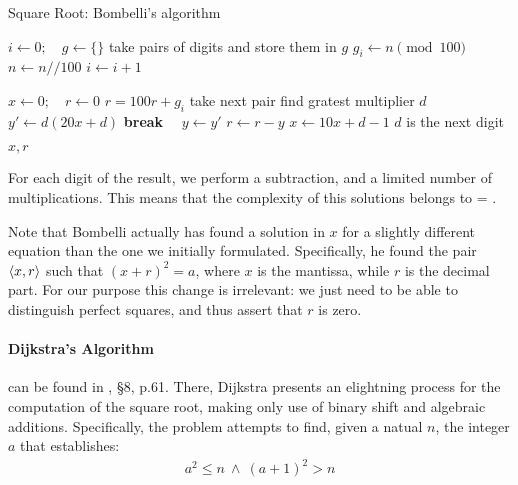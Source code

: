 \begin{algorithm}[H]
  \caption{Square Root: Bombelli's algorithm}
  \label{alg:sqrt:bombelli}
  \begin{algorithmic}[1]

    \State $i \gets 0; \quad g \gets \{\}$
    \Comment take pairs of digits and store them in $g$
      \State $g_i \gets n \pmod{100}$
      \State $n \gets n // 100$
      \State $i \gets i + 1$
    \EndWhile

    \State $x \gets 0; \quad r \gets 0$
      \State $r = 100r + g_i$
      \Comment take next pair
      \Comment find gratest multiplier $d$
        \State $y' \gets d(20x + d)$
          \textbf{break}
        \Else  \ \ $y \gets y'$
        \EndIf
      \EndFor
      \State $r \gets r - y$
      \State $x \gets 10x + d - 1$
      \Comment $d$ is the next digit
    \EndFor

    \State \Return $x, r$

    \EndFunction
  \end{algorithmic}
\end{algorithm}

For each digit of the result, we perform a subtraction, and a limited number of
multiplications. This means that the complexity of this solutions belongs to
 = .

\begin{remark}
  Note that Bombelli actually has found a solution in $x$ for a slightly
  different equation than the one we initially formulated. Specifically, he
  found the pair $\langle x, r\rangle$ such that $(x+r)^2=a$, where $x$ is the mantissa,
  while $r$ is the decimal part. For our purpose this change is irrelevant: we
  just need to be able to distinguish perfect squares, and thus assert that $r$
  is zero.
\end{remark}

\paragraph{Dijkstra's Algorithm \label{par:preq:sqrt:dijkstra}} can be found in
\cite{Dijkstra:adop}, \S 8, p.61. There, Dijkstra presents an elightning
process for the computation of the square root, making only use of binary shift
and algebraic additions.
Specifically, the problem attempts to find, given a natual $n$, the integer $a$
that establishes:
\begin{align}
  \label{eq:preq:dijkstra_problem}
  a^2 \leq n \: \land \: (a+1)^2 > n
\end{align}

